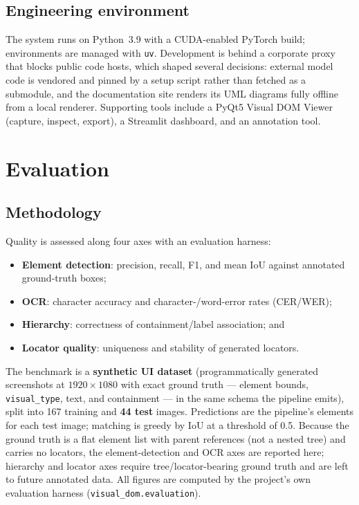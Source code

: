 \documentclass[11pt,a4paper]{article}
\newcommand{\code}[1]{\texttt{#1}}
\begin{document}
\subsection{Engineering environment}
The system runs on Python~3.9 with a CUDA-enabled PyTorch build; environments are
managed with \code{uv}. Development is behind a corporate proxy that blocks public
code hosts, which shaped several decisions: external model code is vendored and
pinned by a setup script rather than fetched as a submodule, and the documentation
site renders its UML diagrams fully offline from a local renderer. Supporting tools
include a PyQt5 Visual DOM Viewer (capture, inspect, export), a Streamlit
dashboard, and an annotation tool.

\section{Evaluation}
\label{sec:eval}

\subsection{Methodology}
Quality is assessed along four axes with an evaluation harness:
\begin{itemize}[leftmargin=1.4em]
  \item \textbf{Element detection}: precision, recall, F1, and mean IoU against
        annotated ground-truth boxes;
  \item \textbf{OCR}: character accuracy and character-/word-error rates (CER/WER);
  \item \textbf{Hierarchy}: correctness of containment/label association; and
  \item \textbf{Locator quality}: uniqueness and stability of generated locators.
\end{itemize}
The benchmark is a \textbf{synthetic UI dataset} (programmatically generated
screenshots at $1920\times1080$ with exact ground truth --- element bounds,
\code{visual\_type}, text, and containment --- in the same schema the pipeline
emits), split into 167 training and \textbf{44 test} images. Predictions are the
pipeline's elements for each test image; matching is greedy by IoU at a
threshold of 0.5. Because the ground truth is a flat element list with parent
references (not a nested tree) and carries no locators, the element-detection and
OCR axes are reported here; hierarchy and locator axes require tree/locator-bearing
ground truth and are left to future annotated data. All figures are computed by the
project's own evaluation harness (\code{visual\_dom.evaluation}).
\end{document}
